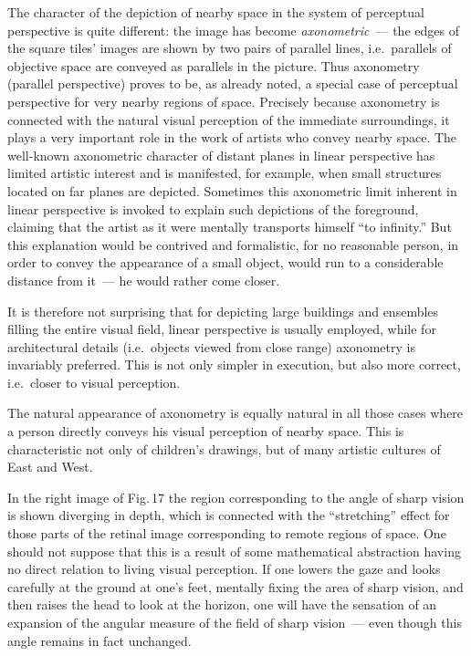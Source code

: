 The character of the depiction of nearby space in the system of perceptual perspective is
quite different: the image has become \emph{axonometric}~--- the edges of the square
tiles' images are shown by two pairs of parallel lines, i.e.\ parallels of objective space
are conveyed as parallels in the picture.  Thus axonometry (parallel perspective) proves
to be, as already noted, a special case of perceptual perspective for very nearby regions
of space.  Precisely because axonometry is connected with the natural visual perception
of the immediate surroundings, it plays a very important role in the work of artists who
convey nearby space.  The well-known axonometric character of distant planes in linear
perspective has limited artistic interest and is manifested, for example, when small
structures located on far planes are depicted.  Sometimes this axonometric limit
inherent in linear perspective is invoked to explain such depictions of the foreground,
claiming that the artist as it were mentally transports himself ``to infinity.''  But this
explanation would be contrived and formalistic, for no reasonable person, in order to
convey the appearance of a small object, would run to a considerable distance from it~---
he would rather come closer.


It is therefore not surprising that for depicting large buildings and ensembles filling the
entire visual field, linear perspective is usually employed, while for architectural details
(i.e.\ objects viewed from close range) axonometry is invariably preferred.  This is not
only simpler in execution, but also more correct, i.e.\ closer to visual perception.

The natural appearance of axonometry is equally natural in all those cases where a
person directly conveys his visual perception of nearby space.  This is characteristic not
only of children's drawings, but of many artistic cultures of East and West.

In the right image of Fig.\,17 the region corresponding to the angle of sharp vision is
shown diverging in depth, which is connected with the ``stretching'' effect for those
parts of the retinal image corresponding to remote regions of space.  One should not
suppose that this is a result of some mathematical abstraction having no direct relation
to living visual perception.  If one lowers the gaze and looks carefully at the ground at
one's feet, mentally fixing the area of sharp vision, and then raises the head to look at
the horizon, one will have the sensation of an expansion of the angular measure of the
field of sharp vision~--- even though this angle remains in fact unchanged.

